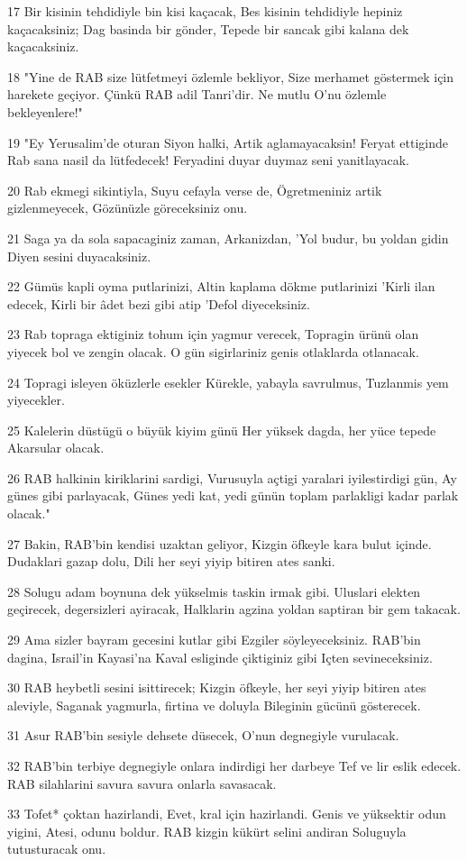 \par 17 Bir kisinin tehdidiyle bin kisi kaçacak, Bes kisinin tehdidiyle hepiniz kaçacaksiniz; Dag basinda bir gönder, Tepede bir sancak gibi kalana dek kaçacaksiniz.
\par 18 "Yine de RAB size lütfetmeyi özlemle bekliyor, Size merhamet göstermek için harekete geçiyor. Çünkü RAB adil Tanri'dir. Ne mutlu O'nu özlemle bekleyenlere!"
\par 19 "Ey Yerusalim'de oturan Siyon halki, Artik aglamayacaksin! Feryat ettiginde Rab sana nasil da lütfedecek! Feryadini duyar duymaz seni yanitlayacak.
\par 20 Rab ekmegi sikintiyla, Suyu cefayla verse de, Ögretmeniniz artik gizlenmeyecek, Gözünüzle göreceksiniz onu.
\par 21 Saga ya da sola sapacaginiz zaman, Arkanizdan, 'Yol budur, bu yoldan gidin Diyen sesini duyacaksiniz.
\par 22 Gümüs kapli oyma putlarinizi, Altin kaplama dökme putlarinizi 'Kirli ilan edecek, Kirli bir âdet bezi gibi atip 'Defol diyeceksiniz.
\par 23 Rab topraga ektiginiz tohum için yagmur verecek, Topragin ürünü olan yiyecek bol ve zengin olacak. O gün sigirlariniz genis otlaklarda otlanacak.
\par 24 Topragi isleyen öküzlerle esekler Kürekle, yabayla savrulmus, Tuzlanmis yem yiyecekler.
\par 25 Kalelerin düstügü o büyük kiyim günü Her yüksek dagda, her yüce tepede Akarsular olacak.
\par 26 RAB halkinin kiriklarini sardigi, Vurusuyla açtigi yaralari iyilestirdigi gün, Ay günes gibi parlayacak, Günes yedi kat, yedi günün toplam parlakligi kadar parlak olacak."
\par 27 Bakin, RAB'bin kendisi uzaktan geliyor, Kizgin öfkeyle kara bulut içinde. Dudaklari gazap dolu, Dili her seyi yiyip bitiren ates sanki.
\par 28 Solugu adam boynuna dek yükselmis taskin irmak gibi. Uluslari elekten geçirecek, degersizleri ayiracak, Halklarin agzina yoldan saptiran bir gem takacak.
\par 29 Ama sizler bayram gecesini kutlar gibi Ezgiler söyleyeceksiniz. RAB'bin dagina, Israil'in Kayasi'na Kaval esliginde çiktiginiz gibi Içten sevineceksiniz.
\par 30 RAB heybetli sesini isittirecek; Kizgin öfkeyle, her seyi yiyip bitiren ates aleviyle, Saganak yagmurla, firtina ve doluyla Bileginin gücünü gösterecek.
\par 31 Asur RAB'bin sesiyle dehsete düsecek, O'nun degnegiyle vurulacak.
\par 32 RAB'bin terbiye degnegiyle onlara indirdigi her darbeye Tef ve lir eslik edecek. RAB silahlarini savura savura onlarla savasacak.
\par 33 Tofet* çoktan hazirlandi, Evet, kral için hazirlandi. Genis ve yüksektir odun yigini, Atesi, odunu boldur. RAB kizgin kükürt selini andiran Soluguyla tutusturacak onu.

